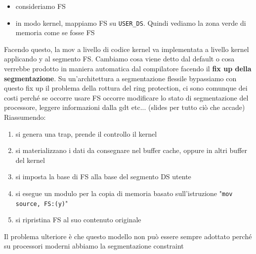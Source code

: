 \documentclass[12pt, oneside]{extbook}
\begin{document}
\begin{itemize}
\item consideriamo FS
\item in modo kernel, mappiamo FS su \texttt{USER\_DS}. Quindi vediamo la zona verde di memoria come se fosse FS
\end{itemize}
Facendo questo, la mov a livello di codice kernel va implementata a livello kernel applicando y al segmento FS. Cambiamo cosa viene detto dal default o cosa verrebbe prodotto in maniera automatica dal compilatore facendo il \textbf{fix up della segmentazione}. Su un'architettura a segmentazione flessile bypassiamo con questo fix up il problema della rottura del ring protection, ci sono comunque dei costi perché se occorre usare FS occorre modificare lo stato di segmentazione del processore, leggere informazioni dalla gdt etc...
(slides per tutto ciò che accade) Riassumendo:
\begin{enumerate}
	\item si genera una trap, prende il controllo il kernel
	\item si materializzano i dati da consegnare nel buffer cache, oppure in altri buffer del kernel
	\item si imposta la base di FS alla base del segmento DS utente
	\item si esegue un modulo per la copia di memoria basato sull'istruzione "\texttt{mov source, FS:(y)}"
	\item si ripristina FS al suo contenuto originale
\end{enumerate}
Il problema ulteriore è che questo modello non può essere sempre adottato perché su processori moderni abbiamo la segmentazione constraint
\end{document}
